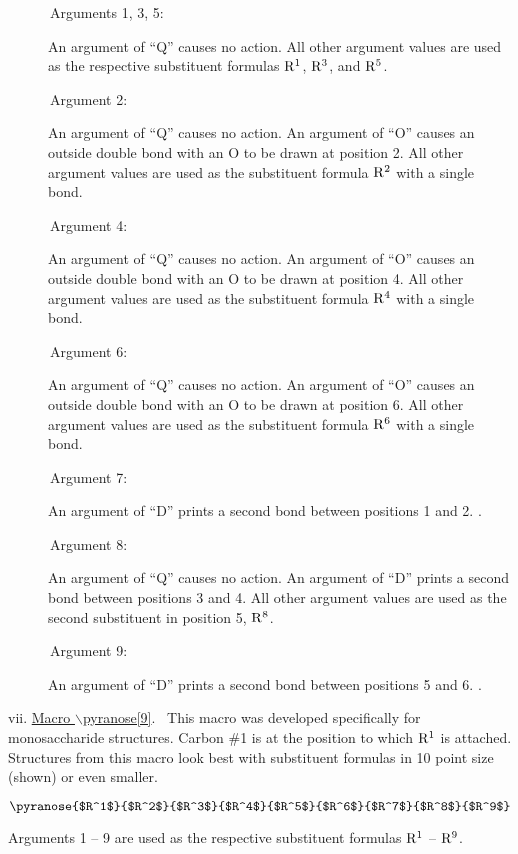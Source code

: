  \begin{description}
 \item[{\rm \ \ \ \ \ \ Arguments 1, 3, 5:}] An argument of ``Q''
      causes no action. All other argument values are used
      as the respective substituent formulas ${\rm R^1}$, 
      ${\rm R^3}$, and ${\rm R^5}$. 
 \item[{\rm \ \ \ \ \ \ Argument 2:}] An argument of ``Q'' causes
      no action. An argument of ``O'' causes an outside double
      bond with an O to be drawn at position 2. All other
      argument values are used as the substituent formula
      ${\rm R^2}$ with a single bond.
 \item[{\rm \ \ \ \ \ \ Argument 4:}] An argument of ``Q'' causes
      no action. An argument of ``O'' causes an outside double
      bond with an O to be drawn at position 4. All other
      argument values are used as the substituent formula
      ${\rm R^4}$ with a single bond.
 \item[{\rm \ \ \ \ \ \ Argument 6:}] An argument of ``Q'' causes
      no action. An argument of ``O'' causes an outside double
      bond with an O to be drawn at position 6. All other
      argument values are used as the substituent formula
      ${\rm R^6}$ with a single bond.
 \item[{\rm \ \ \ \ \ \ Argument 7:}] An argument of ``D''
      prints a second bond between positions 1 and 2. \ri .
 \item[{\rm \ \ \ \ \ \ Argument 8:}] An argument of ``Q'' causes
      no action. An argument of ``D'' prints a second bond
      between positions 3 and 4. All other argument values
      are used as the second substituent in position 5, 
      ${\rm R^8}$.
 \item[{\rm \ \ \ \ \ \ Argument 9:}] An argument of ``D''
      prints a second bond between positions 5 and 6. \ri .
 \end{description}
 
 \vspace{\len mm}
 \indent vii. \underline{Macro $\backslash $pyranose[9]}.
 \ This macro was developed specifically for monosaccharide
 structures. Carbon \#1 is at the position to which 
 ${\rm R^1}$ is attached. Structures from this macro look
 best with substituent formulas in 10 point size (shown)
 or even smaller.

 \[ \pyranose{$R^1$}{$R^2$}{$R^3$}{$R^4$}{$R^5$}{$R^6$}
             {$R^7$}{$R^8$}{$R^9$}  \]

 Arguments 1 -- 9 are used as the respective substituent
 formulas ${\rm R^1}$ -- ${\rm R^9}$. \rhq 

